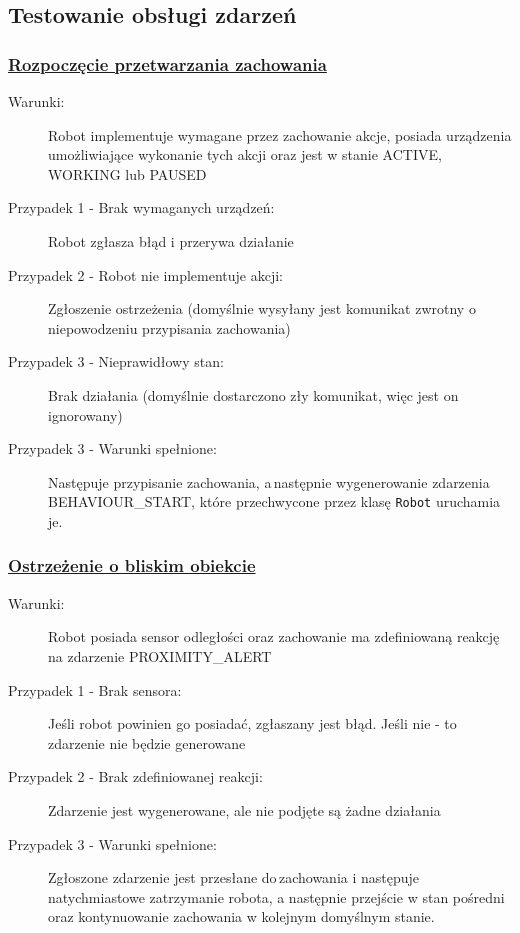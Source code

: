\subsection{Testowanie obsługi zdarzeń}

\subsubsection{\underline{Rozpoczęcie przetwarzania zachowania}}

\begin{description}
    \item[Warunki:]Robot implementuje wymagane przez zachowanie akcje, posiada urządzenia umożliwiające wykonanie tych akcji oraz jest w stanie ACTIVE, WORKING lub PAUSED
    \item[Przypadek 1 - Brak wymaganych urządzeń:]Robot zgłasza błąd i przerywa działanie
    \item[Przypadek 2 - Robot nie implementuje akcji:]Zgłoszenie ostrzeżenia (domyślnie wysyłany jest komunikat zwrotny o niepowodzeniu przypisania zachowania)
    \item[Przypadek 3 - Nieprawidłowy stan:]Brak działania (domyślnie dostarczono zły komunikat, więc jest on ignorowany)
    \item[Przypadek 3 - Warunki spełnione:]Następuje przypisanie zachowania, a\,następnie wygenerowanie zdarzenia BEHAVIOUR\_START, które przechwycone przez klasę {\tt Robot} uruchamia je.\\
\end{description}

\subsubsection*{\underline{Ostrzeżenie o bliskim obiekcie}}

\begin{description}
    \item[Warunki:]Robot posiada sensor odległości oraz zachowanie ma zdefiniowaną reakcję na zdarzenie PROXIMITY\_ALERT
    \item[Przypadek 1 - Brak sensora:]Jeśli robot powinien go posiadać, zgłaszany jest błąd. Jeśli nie - to zdarzenie nie będzie generowane
    \item[Przypadek 2 - Brak zdefiniowanej reakcji:]Zdarzenie jest wygenerowane, ale nie podjęte są żadne działania
    \item[Przypadek 3 - Warunki spełnione:]Zgłoszone zdarzenie jest przesłane do\,zachowania i następuje natychmiastowe zatrzymanie robota, a następnie przejście w stan pośredni oraz kontynuowanie zachowania w kolejnym domyślnym stanie.\\
\end{description}

